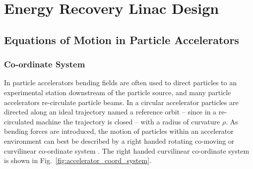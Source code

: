\documentclass[../main.tex]{subfiles}
\begin{document}
\chapter{Energy Recovery Linac Design}
\label{Energy_Recovery_Linac_Design} %

\section{Equations of Motion in Particle Accelerators}

\subsection{Co-ordinate System}

In particle accelerators bending fields are often used to direct particles to an experimental station downstream of the particle source, and many particle accelerators re-circulate particle beams. In a circular accelerator particles are directed along an ideal trajectory named a reference orbit -- since in a re-circulated machine the trajectory is closed -- with a radius of curvature $\rho$. As bending forces are introduced, the motion of particles within an accelerator environment can best be described by a right handed rotating co-moving or curvilinear co-ordinate system \cite{wille2000physics}. The right handed curvilinear co-ordinate system is shown in Fig.~\ref{fig:accelerator_coord_system}.   
\end{document}
